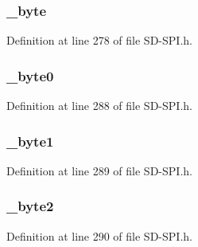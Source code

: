 \subsubsection[{\+\_\+byte}]{ \+\_\+byte}\label{union_r_e_s_p_o_n_s_e__7_aad6b25752650539bbd15773c4b71b4d4}


Definition at line 278 of file S\+D-\/\+S\+P\+I.\+h.

\hypertarget{union_r_e_s_p_o_n_s_e__7_a93716eb22819e26ee62f5d28d97adb9f}{}
\subsubsection[{\+\_\+byte0}]{ \+\_\+byte0}\label{union_r_e_s_p_o_n_s_e__7_a93716eb22819e26ee62f5d28d97adb9f}


Definition at line 288 of file S\+D-\/\+S\+P\+I.\+h.

\hypertarget{union_r_e_s_p_o_n_s_e__7_a7d5f3b40b15af6ed45be5faa5100147c}{}
\subsubsection[{\+\_\+byte1}]{ \+\_\+byte1}\label{union_r_e_s_p_o_n_s_e__7_a7d5f3b40b15af6ed45be5faa5100147c}


Definition at line 289 of file S\+D-\/\+S\+P\+I.\+h.

\hypertarget{union_r_e_s_p_o_n_s_e__7_a32a342025f3d1eed4ac129d9253460e3}{}
\subsubsection[{\+\_\+byte2}]{ \+\_\+byte2}\label{union_r_e_s_p_o_n_s_e__7_a32a342025f3d1eed4ac129d9253460e3}


Definition at line 290 of file S\+D-\/\+S\+P\+I.\+h.


